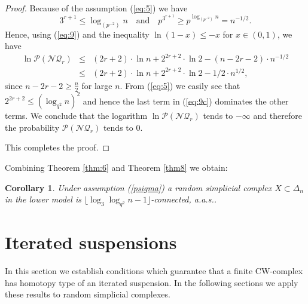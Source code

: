 \documentclass[11pt,twoside, reqno]{amsart}
\theoremstyle{plain}
\newtheorem{corollary}[lema]{Corollary}
\theoremstyle{definition}
\begin{document}
\begin{proof}
Because of the assumption (\ref{eq:5}) we have
$$
3^{r+1}\le \log_{(p^{-2})}n \quad \mbox{and}\quad p^{3^{r+1}} \ge p^{\log_{(p^{-2})}n} = n^{-1/2}.
$$
Hence, using (\ref{eq:9}) and the inequality $\ln (1-x)\le -x$ for $x\in (0,1)$, we have
\begin{eqnarray}\label{eq:9c}
\ln \mathcal P(\mathcal {NQ}_r) &\le & (2r+2)\cdot \ln n+ 2^{2r+2}\cdot \ln 2- (n-2r-2)\cdot n^{-1/2}\nonumber \\
&\le &(2r+2)\cdot \ln n+ 2^{2r+2}\cdot \ln 2- 1/2\cdot n^{1/2},
\end{eqnarray}
since $n-2r-2 \ge \frac{n}{2}$ for large $n$. From (\ref{eq:5}) we easily see that $2^{2r+2}\le (\log_{q^{2}}n)^2$ and hence the last term in (\ref{eq:9c}) dominates the other terms.
We conclude that the logarithm $\ln \mathcal P(\mathcal {NQ}_r)$ tends to $-\infty$ and therefore the probability 
$\mathcal P(\mathcal {NQ}_r)$ tends to $0$. 

This completes the proof. 
\end{proof}

Combining Theorem \ref{thm:6} and Theorem \ref{thm8} we obtain:

\begin{corollary}\label{cor:conn}
Under assumption (\ref{psigma}) a random simplicial complex $X\subset \Delta_n$ in the lower model is 
$\lfloor \log_3\log_{q^{2}} n -1\rfloor$-connected, a.a.s.. 
\end{corollary}

\section{Iterated suspensions}

In this section we establish conditions which guarantee that a finite  CW-complex has homotopy type of an iterated suspension. In the following sections we apply these results to random simplicial complexes. 
\end{document}
